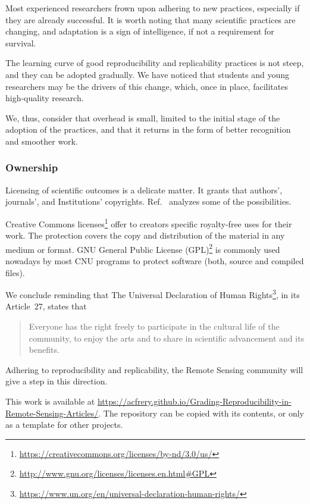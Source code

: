 \documentclass[journal,twoside]{IEEEtran}
\begin{document}
Most experienced researchers frown upon adhering to new practices, especially if they are already successful.
It is worth noting that many scientific practices are changing, and adaptation is a sign of intelligence, if not a requirement for survival.

The learning curve of good reproducibility and replicability practices is not steep, and they can be adopted gradually.
We have noticed that students and young researchers may be the drivers of this change, which, once in place, facilitates high-quality research.

We, thus, consider that overhead is small, limited to the initial stage of the adoption of the practices, and that it returns in the form of better recognition and smoother work.

\subsubsection{Ownership}\label{Sec:Ownership}

Licensing of scientific outcomes is a delicate matter.
It grants that authors', journals', and Institutions' copyrights.
Ref.~\cite{TheLegalFrameworkforReproducibleScientificResearchLicensingandCopyright} analyzes some of the possibilities.  

Creative Commons licenses\footnote{\url{https://creativecommons.org/licenses/by-nd/3.0/us/}} offer to creators specific royalty-free uses for their work. 
The protection covers the copy and distribution of the material in any medium or format. 
GNU General Public License (GPL)\footnote{\url{http://www.gnu.org/licenses/licenses.en.html#GPL}} is commonly used nowadays by most CNU programs to protect software (both, source and compiled files). 

We conclude reminding that The Universal Declaration of Human Rights\footnote{\url{https://www.un.org/en/universal-declaration-human-rights/}}, in its Article~27, states that
\begin{quote}
	Everyone has the right freely to participate in the cultural life of the community, to enjoy the arts and to share in scientific advancement and its benefits.
\end{quote}
Adhering to reproducibility and replicability, the Remote Sensing community will give a step in this direction.

This work is available at \url{https://acfrery.github.io/Grading-Reproducibility-in-Remote-Sensing-Articles/}.
The repository can be copied with its contents, or only as a template for other projects.
\end{document}

